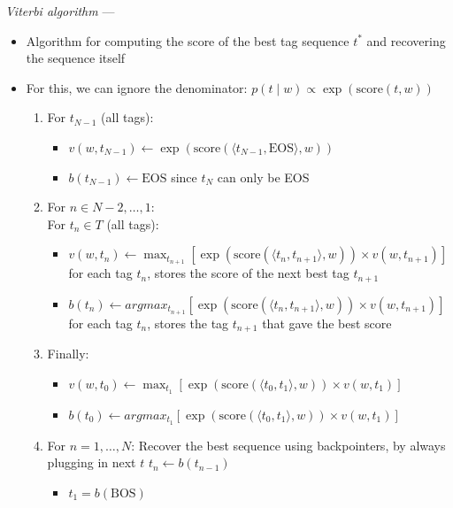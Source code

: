 \emph{Viterbi algorithm} --- 
\begin{itemize}
    \item Algorithm for computing the score of the best tag sequence $t^*$ and recovering the sequence itself
    \item For this, we can ignore the denominator: $
    p(t \mid w) \propto \exp(\textrm{score}(t, w))
    $
    \begin{enumerate}
        \item For $t_{N-1}$ (all tags):
        \begin{itemize}
            \item $v(w, t_{N-1}) \gets \exp(\textrm{score}(\langle t_{N-1}, \textrm{EOS} \rangle, w))$
            \item $
            b(t_{N-1}) \gets \textrm{EOS}$ since $t_N$ can only be EOS
        \end{itemize}
        \item For $n \in N-2, \dots, 1$:\\
        For $t_n \in T$ (all tags):
        \begin{itemize}
            \item
            $
            v(w, t_n) \gets \max_{t_{n+1}} [ \exp(\textrm{score}(\langle t_n, t_{n+1} \rangle, w)) \times v(w, t_{n+1}) ]
            $ for each tag $t_n$, stores the score of the next best tag $t_{n+1}$ 
            \item $
            b(t_n) \gets argmax_{t_{n+1}} [ \exp(\textrm{score}(\langle t_n, t_{n+1} \rangle, w)) \times v(w, t_{n+1}) ]
            $ for each tag $t_n$, stores the tag $t_{n+1}$ that gave the best score
        \end{itemize}
        \item Finally:
        \begin{itemize}
            \item $
            v(w, t_0) \gets \max_{t_1} [  \exp(\textrm{score}(\langle t_0, t_1 \rangle, w)) \times v(w, t_1)]
            $
            \item $
            b(t_0) \gets argmax_{t_1} [  \exp(\textrm{score}(\langle t_0, t_1 \rangle, w)) \times v(w, t_1)]
            $
        \end{itemize}
        \item For $n = 1, \dots, N$: Recover the best sequence using backpointers, by always plugging in next $t$
        $
        t_n \gets b(t_{n-1})
        $
        \begin{itemize}
            \item $t_1 = b(\textrm{BOS})$

\end{itemize}
\end{enumerate}
\end{itemize}
